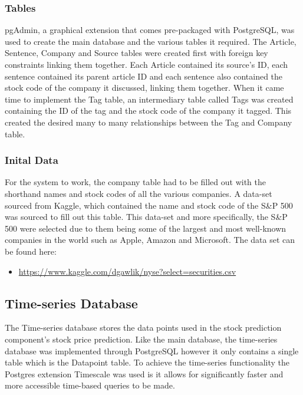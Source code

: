             \subsubsection{Tables}
            pgAdmin, a graphical extension that comes pre-packaged with PostgreSQL, was used to create the main database and the various tables it required. The Article, Sentence, Company and Source tables were created first with foreign key constraints linking them together. Each Article contained its source's ID, each sentence contained its parent article ID and each sentence also contained the stock code of the company it discussed, linking them together. When it came time to implement the Tag table, an intermediary table called Tags was created containing the ID of the tag and the stock code of the company it tagged. This created the desired many to many relationships between the Tag and Company table.
            
            \subsubsection{Inital Data}
            For the system to work, the company table had to be filled out with the shorthand names and stock codes of all the various companies. A data-set sourced from Kaggle, which contained the name and stock code of the S\&P 500 \citep{SP} was sourced to fill out this table. This data-set and more specifically, the S\&P 500 were selected due to them being some of the largest and most well-known companies in the world such as Apple, Amazon and Microsoft. The data set can be found here:
            \begin{itemize}
                \item \url{https://www.kaggle.com/dgawlik/nyse?select=securities.csv}
            \end{itemize}
            
        \subsection{Time-series Database}
        The Time-series database stores the data points used in the stock prediction component’s stock price prediction. Like the main database, the time-series database was implemented through PostgreSQL \citep{technology:PostgreSQL} however it only contains a single table which is the Datapoint table. To achieve the time-series functionality the Postgres extension Timescale \cite{technology:Timescale} was used is it allows for significantly faster and more accessible time-based queries to be made. 
        
